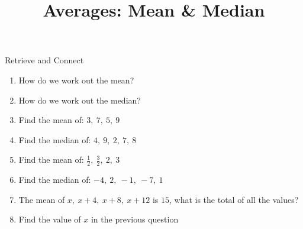 \documentclass{beamer}
\title{Averages: Mean \& Median}
\author{}
\date{}
\newcommand{\ashow}[1]{\uncover<2->{\textcolor{red}{\small #1}}}
\newcommand{\ashowq}[1]{\alt<2->{\textcolor{red}{\small #1}}{?}}
\begin{document}
\begin{frame}{Retrieve and Connect}
\vspace{-0.8em}

\footnotesize
\begin{enumerate}\itemsep2pt
  \item How do we work out the mean? \ashow{Add the values and divide by how many there are.}
  \item How do we work out the median? \ashow{Order the data and find the middle value.}
  \item Find the mean of: $3,\ 7,\ 5,\ 9$ \ashow{$=6$}
  \item Find the median of: $4,\ 9,\ 2,\ 7,\ 8$ \ashow{$=7$}
  \item Find the mean of: $\frac{1}{2},\ \frac{3}{2},\ 2,\ 3$ \ashow{$=\frac{7}{4}$}
  \item Find the median of: $-4,\ 2,\ -1,\ -7,\ 1$ \ashow{$=-1$}
  \item The mean of $x,\ x+4,\ x+8,\ x+12$ is $15$, what is the total of all the values? \ashow{$60$}
  \item Find the value of $x$ in the previous question \ashow{$x=9$}
\end{enumerate}

\end{frame}
\end{document}
